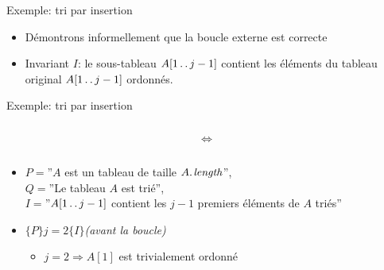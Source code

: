 \begin{frame}{Exemple: tri par insertion}

\begin{center}
\end{center}

\begin{itemize}
\item Démontrons informellement que la boucle externe est correcte
\item Invariant $I$: le sous-tableau $A[1\mathinner{\ldotp\ldotp} j-1]$ contient les
  éléments du tableau original $A[1\mathinner{\ldotp\ldotp} j-1]$ ordonnés.
\end{itemize}

\end{frame}

\begin{frame}{Exemple: tri par insertion}
\begin{columns}
\begin{column}{3cm}
\end{column}
$\Leftrightarrow$
\begin{column}{5cm}
\end{column}
\end{columns}

\begin{itemize}
\item $P=$''$A$ est un tableau de taille $\attrib{A}{length}$'',\\
$Q=$''Le tableau $A$ est trié'',\\
$I=$''$A[1\mathinner{\ldotp\ldotp} j-1]$ contient les $j-1$ premiers éléments de $A$ triés''

\bigskip

\item $\{P\} j=2 \{I\}$\hfill{\it(avant la boucle)}
\begin{itemize}
\item $j=2 \Rightarrow A[1]$ est trivialement ordonné
\end{itemize}
\end{itemize}

\end{frame}

